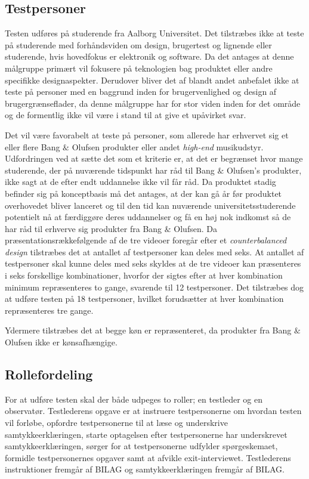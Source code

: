 \subsection{Testpersoner}
\label{TestpersonerValgAfGestikker}
%
Testen udføres på studerende fra Aalborg Universitet. Det tilstræbes ikke at teste på studerende med forhåndsviden om design, brugertest og lignende eller studerende, hvis hovedfokus er elektronik og software. Da det antages at denne målgruppe primært vil fokusere på teknologien bag produktet eller andre specifikke designaspekter. Derudover bliver det af \textcite[s. 110]{Book:OUE} blandt andet anbefalet ikke at teste på personer med en baggrund inden for brugervenlighed og design af brugergrænseflader, da denne målgruppe har for stor viden inden for det område og de formentlig ikke vil være i stand til at give et upåvirket svar.

Det vil være favorabelt at teste på personer, som allerede har erhvervet sig et eller flere Bang $\&$ Olufsen produkter eller andet \textit{high-end} musikudstyr. Udfordringen ved at sætte det som et kriterie er, at det er begrænset hvor mange studerende, der på nuværende tidspunkt har råd til Bang $\&$ Olufsen's produkter, ikke sagt at de efter endt uddannelse ikke vil får råd. Da produktet stadig befinder sig på konceptbasis må det antages, at der kan gå år før produktet overhovedet bliver lanceret og til den tid kan nuværende universitetsstuderende potentielt nå at færdiggøre deres uddannelser og få en høj nok indkomst så de har råd til erhverve sig produkter fra Bang $\&$ Olufsen. \blankline
%        
Da præsentationsrækkefølgende af de tre videoer foregår efter et \textit{counterbalanced design} tilstræbes det at antallet af testpersoner kan deles med seks. At antallet af testpersoner skal kunne deles med seks skyldes at de tre videoer kan præsenteres i seks forskellige kombinationer, hvorfor der sigtes efter at hver kombination minimum repræsenteres to gange, svarende til 12 testpersoner. Det tilstræbes dog at udføre testen på 18 testpersoner, hvilket forudsætter at hver kombination repræsenteres tre gange. 

Ydermere tilstræbes det at begge køn er repræsenteret, da produkter fra Bang $\&$ Olufsen ikke er kønsafhængige. 
%

\subsection{Rollefordeling}
\label{RollerfordelingValgAfGestikker}
%
For at udføre testen skal der både udpeges to roller; en testleder og en observatør. Testlederens opgave er at instruere testpersonerne om hvordan testen vil forløbe, opfordre testpersonerne til at læse og underskrive samtykkeerklæringen, starte optagelsen efter testpersonerne har underskrevet samtykkeerklæringen, sørger for at testpersonerne udfylder spørgeskemaet, formidle testpersonernes opgaver samt at afvikle exit-interviewet. Testlederens instruktioner fremgår af BILAG og samtykkeerklæringen fremgår af BILAG. 

